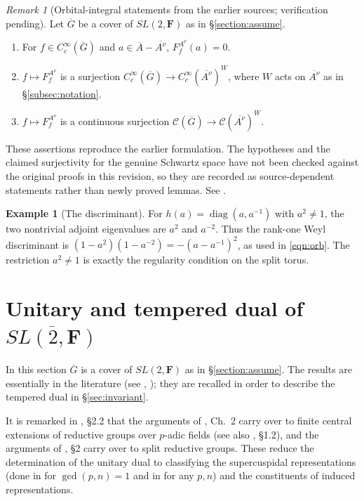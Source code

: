 \documentclass[12pt,letterpaper]{article}
\theoremstyle{definition}
\newtheorem{example}[theorem]{Example}
\theoremstyle{remark}
\newtheorem{remark}[theorem]{Remark}
\newcommand{\F}{\mathbf{F}}
\newcommand{\bG}{\overline{G}}
\newcommand{\bA}{\overline{A}}
\newcommand{\calC}{\mathcal C}
\begin{document}
\begin{remark}[Orbital-integral statements from the earlier sources; verification pending]\label{lem:orbital}
Let $\bG$ be a cover of $SL(2,\F)$ as in \S\ref{section:assume}.
\begin{enumerate}[label=(\alph*),leftmargin=*,itemsep=1pt]
\item For $f\in C_c^\infty(\bG)$ and $a\in\bA-\overline{A^\nu}$, $F_f^{A^\nu}(a)=0$.
\item $f\mapsto F_f^{A^\nu}$ is a surjection $C_c^\infty(\bG)\to C_c^\infty(\overline{A^\nu})^W$, where $W$
acts on $\overline{A^\nu}$ as in \S\ref{subsec:notation}.
\item $f\mapsto F_f^{A^\nu}$ is a continuous surjection $\calC(\bG)\to\calC(\overline{A^\nu})^W$.
\end{enumerate}
\end{remark}
These assertions reproduce the earlier formulation.  The hypotheses and
the claimed surjectivity for the genuine Schwartz space have not been
checked against the original proofs in this revision, so they are recorded
as source-dependent statements rather than newly proved lemmas.  See
\cite{Jo94,Jo01}. 

\begin{example}[The discriminant]
For $h(a)=\operatorname{diag}(a,a^{-1})$ with $a^2\ne1$,
the two nontrivial adjoint eigenvalues are $a^2$ and $a^{-2}$.
Thus the rank-one Weyl discriminant is
$(1-a^2)(1-a^{-2})=-(a-a^{-1})^2$, as used in
\eqref{eqn:orb}.  The restriction $a^2\ne1$ is exactly the
regularity condition on the split torus.
\end{example}

\section{Unitary and tempered dual of \texorpdfstring{$\overline{SL(2,\F)}$}{SL(2,F) cover}}\label{sec:unitary}

In this section $\bG$ is a cover of $SL(2,\F)$ as in \S\ref{section:assume}. The results are
essentially in the literature (see \cite{Jo99a}, \cite{Jo01}); they are recalled in order to describe
the tempered dual in \S\ref{sec:invariant}. 

It is remarked in \cite{Be84}, \S2.2 that the arguments of \cite{BZ76}, Ch.~2 carry over to finite
central extensions of reductive groups over $p$-adic fields (see also \cite{KP84}, \S1.2), and the
arguments of \cite{BZ77}, \S2 carry over to split reductive groups. These reduce the determination of the
unitary dual to classifying the supercuspidal representations (done in \cite{Jo99b} for
$\gcd(p,n)=1$ and in \cite{Jo98} for any $p,n$) and the constituents of induced representations.
\end{document}
